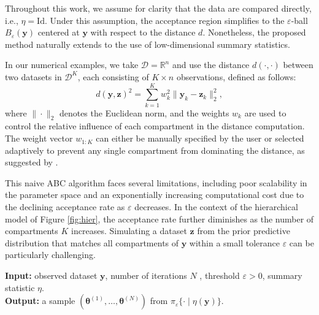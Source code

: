 \documentclass[11pt,a4paper]{article}
\def\dataspace{\mathcal{D}}
\def\obsdata{\mathbf{y}}
\def\param{\boldsymbol{\theta}}
\def\simdata{\mathbf{z}}
\def\eps{\varepsilon}
\theoremstyle{plain}
\theoremstyle{definition}
\theoremstyle{remark}
\begin{document}
Throughout this work, we assume for clarity that the data are compared directly, i.e., $\eta = \mathrm{Id}$. Under this assumption, the acceptance region simplifies to the $\varepsilon$-ball $B_{\varepsilon}(\obsdata)$ centered at $\obsdata$ with respect to the distance $d$. Nonetheless, the proposed method naturally extends to the use of low-dimensional summary statistics.

In our numerical examples, we take $\dataspace = \mathbb R^n$ and use the distance $d(\cdot,\cdot)$ between two datasets in \( \dataspace^K \), each consisting of \( K \times n \) observations, defined as follows: 
\begin{equation}
    \label{eqdistance}
    d(\obsdata, \simdata)^2 = {\sum_{k=1}^K w_k^2 \| \obsdata_k - \simdata_k \|_2^2},
\end{equation}
where \( \| \cdot \|_2 \) denotes the Euclidean norm, and the weights \( w_k \) are used to control the relative influence of each compartment in the distance computation. The weight vector \( w_{1:K} \) can either be manually specified by the user or selected adaptively to prevent any single compartment from dominating the distance, as suggested by \citet{prangle2017adapting}.

This naive ABC algorithm faces several limitations, including poor scalability in the parameter space and an exponentially increasing computational cost due to the declining acceptance rate as \( \varepsilon \) decreases. In the context of the hierarchical model of Figure \ref{fig:hier}, the acceptance rate further diminishes as the number of compartments \( K \) increases. Simulating a dataset \( \simdata \) from the prior predictive distribution that matches all compartments of \( \obsdata \) within a small tolerance \( \varepsilon \) can be particularly challenging. 

\begin{algorithm}[ht]
\caption{Vanilla Approximate Bayesian Computation}
\label{alg:abc_vanilla}
\textbf{Input: }observed dataset $\obsdata$, number of iterations $N$ , threshold $\eps>0$, summary statistic $\eta$.\\
\textbf{Output: }a sample $(\param^{(1)}, \dots, \param^{(N)})$ from $\pi_\eps\{\cdot\mid\eta(\obsdata)\}$.\\

\BlankLine

\For{$i = 1,\dots, N$}{
    \Repeat{$d\{\eta(\simdata^{(i)}),\eta(\obsdata)\})\leq \eps$}{
        $\param^{(i)} \sim \pi(\cdot)$\;
        $\simdata^{(i)}\sim f(\cdot\mid\param^{(i)})$\;
        }
    }
\end{algorithm}
\end{document}
